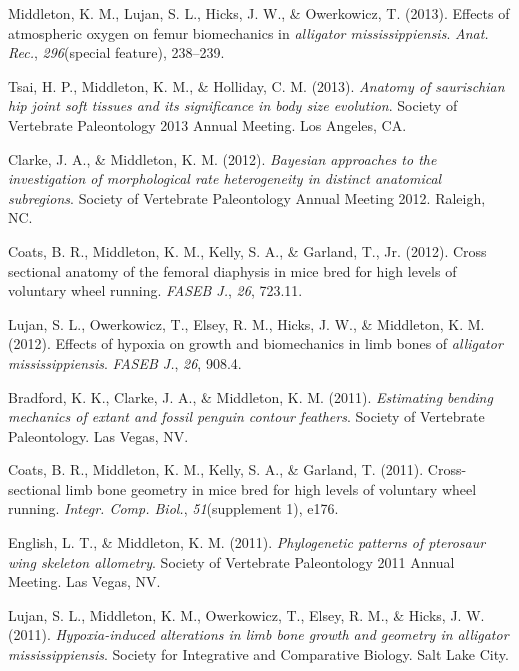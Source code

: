 \documentclass[11pt, a4paper]{awesome-cv}
\begin{document}
\leavevmode\hypertarget{ref-middleton_effects_2013}{}%
Middleton, K. M., Lujan, S. L., Hicks, J. W., \& Owerkowicz, T. (2013).
Effects of atmospheric oxygen on femur biomechanics in \emph{alligator
mississippiensis}. \emph{Anat. Rec.}, \emph{296}(special feature),
238--239.

\leavevmode\hypertarget{ref-tsai_anatomy_2013}{}%
Tsai, H. P., Middleton, K. M., \& Holliday, C. M. (2013). \emph{Anatomy
of saurischian hip joint soft tissues and its significance in body size
evolution}. Society of Vertebrate Paleontology 2013 Annual Meeting. Los
Angeles, CA.

\leavevmode\hypertarget{ref-clarke_bayesian_2012}{}%
Clarke, J. A., \& Middleton, K. M. (2012). \emph{Bayesian approaches to
the investigation of morphological rate heterogeneity in distinct
anatomical subregions}. Society of Vertebrate Paleontology Annual
Meeting 2012. Raleigh, NC.

\leavevmode\hypertarget{ref-coats_cross_2012}{}%
Coats, B. R., Middleton, K. M., Kelly, S. A., \& Garland, T., Jr.
(2012). Cross sectional anatomy of the femoral diaphysis in mice bred
for high levels of voluntary wheel running. \emph{FASEB J.}, \emph{26},
723.11.

\leavevmode\hypertarget{ref-lujan_effects_2012}{}%
Lujan, S. L., Owerkowicz, T., Elsey, R. M., Hicks, J. W., \& Middleton,
K. M. (2012). Effects of hypoxia on growth and biomechanics in limb
bones of \emph{alligator mississippiensis}. \emph{FASEB J.}, \emph{26},
908.4.

\leavevmode\hypertarget{ref-bradford_estimating_2011}{}%
Bradford, K. K., Clarke, J. A., \& Middleton, K. M. (2011).
\emph{Estimating bending mechanics of extant and fossil penguin contour
feathers}. Society of Vertebrate Paleontology. Las Vegas, NV.

\leavevmode\hypertarget{ref-coats_cross_2011}{}%
Coats, B. R., Middleton, K. M., Kelly, S. A., \& Garland, T. (2011).
Cross-sectional limb bone geometry in mice bred for high levels of
voluntary wheel running. \emph{Integr. Comp. Biol.},
\emph{51}(supplement 1), e176.

\leavevmode\hypertarget{ref-english_phylogenetic_2011}{}%
English, L. T., \& Middleton, K. M. (2011). \emph{Phylogenetic patterns
of pterosaur wing skeleton allometry}. Society of Vertebrate
Paleontology 2011 Annual Meeting. Las Vegas, NV.

\leavevmode\hypertarget{ref-lujan_hypoxia_2011}{}%
Lujan, S. L., Middleton, K. M., Owerkowicz, T., Elsey, R. M., \& Hicks,
J. W. (2011). \emph{Hypoxia-induced alterations in limb bone growth and
geometry in \textup{alligator mississippiensis}}. Society for
Integrative and Comparative Biology. Salt Lake City.
\end{document}
